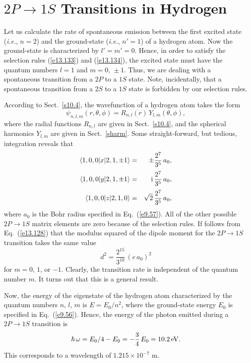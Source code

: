 \section{$2P\rightarrow 1S$ Transitions in Hydrogen}
Let us calculate the rate of spontaneous emission between the
first excited state ({\em i.e.}, $n=2$) and the ground-state ({\em i.e.}, $n'=1$) of a hydrogen
atom. Now the ground-state is characterized by $l'=m'=0$. Hence, in
order to satisfy the selection rules (\ref{e13.133}) and (\ref{e13.134}),
the excited state must have the quantum numbers $l=1$ and $m=0,\,\pm 1$.
Thus, we are dealing with a spontaneous transition from a $2P$ to a $1S$
state. Note, incidentally, that a spontaneous transition  from a $2S$ to  a $1S$ state
is forbidden by our selection rules.

According to Sect.~\ref{s10.4},  the wavefunction of a hydrogen atom takes the form
\begin{equation}
\psi_{n,l,m}(r,\theta,\phi) = R_{n,l}(r)\,Y_{l,m}(\theta,\phi),
\end{equation}
where the radial functions $R_{n,l}$ are given in Sect.~\ref{s10.4},
and the spherical harmonics $Y_{l,m}$ are given in Sect.~\ref{sharm}.
Some straight-forward, but tedious, integration reveals that
\begin{eqnarray}
\langle 1,0,0|x|2,1,\pm 1\rangle &=& \pm \frac{2^7}{3^5}\,a_0,\\[0.5ex]
\langle 1,0,0|y|2,1,\pm 1\rangle &=& {\rm i}\,\frac{2^7}{3^5}\,a_0,\\[0.5ex]
\langle 1,0,0|z|2,1,0\rangle &=& \sqrt{2}\, \frac{2^7}{3^5}\,a_0,
\end{eqnarray}
where $a_0$ is the Bohr radius specified in Eq.~(\ref{e9.57}).
All of the other possible $2P\rightarrow 1S$ matrix elements are zero because of
the selection rules. If follows from Eq.~(\ref{e13.128}) that the modulus
squared of the dipole moment for the $2P\rightarrow 1S$ transition takes the same value
\begin{equation}\label{e13.139}
d^2 = \frac{2^{15}}{3^{10}}\,(e\,a_0)^2
\end{equation}
for $m=0$, $1$, or $-1$. Clearly,  the transition rate is independent
of the quantum number $m$. It turns out that this is a general result.

Now, the energy of the eigenstate of the hydrogen atom characterized
by the quantum numbers $n$, $l$, $m$ is $E = E_0/n^2$, where
the ground-state energy $E_0$ is specified in Eq.~(\ref{e9.56}).
Hence, the energy of the photon emitted during a $2P\rightarrow 1S$ 
transition is
\begin{equation}\label{e13.140}
\hbar\,\omega = E_0/4 - E_0 = -\frac{3}{4}\,E_0 = 10.2\,{\rm eV}.
\end{equation}
This corresponds to a wavelength of $1.215\times 10^{-7}$ m.

